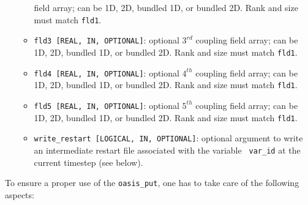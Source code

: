 \begin{itemize}
\begin{itemize}
    field array; can be 1D, 2D, bundled 1D, or bundled 2D.  Rank and size
    must match {\tt fld1}.
  \item {\tt fld3 [REAL, IN, OPTIONAL]}: optional $3^{rd}$ coupling
    field array; can be 1D, 2D, bundled 1D, or bundled 2D.  Rank and size
    must match {\tt fld1}.
  \item {\tt fld4 [REAL, IN, OPTIONAL]}: optional $4^{th}$ coupling
    field array; can be 1D, 2D, bundled 1D, or bundled 2D.  Rank and size
    must match {\tt fld1}.
  \item {\tt fld5 [REAL, IN, OPTIONAL]}: optional $5^{th}$ coupling
    field array; can be 1D, 2D, bundled 1D, or bundled 2D.  Rank and size
    must match {\tt fld1}.
  \item {\tt write\_restart [LOGICAL, IN, OPTIONAL]}: optional argument to write an 
    intermediate restart file associated with the variable {\tt
      var\_id} at the current timestep (see below).
  \end{itemize}
\end{itemize}

To ensure a proper use of the {\tt oasis\_put}, one has to take care
of the following aspects:

